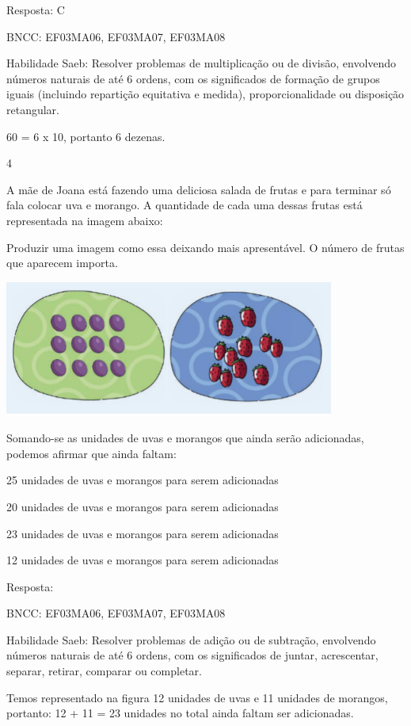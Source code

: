 \begin{escolha}
{\begin{escolha}
{Resposta: C

BNCC: EF03MA06, EF03MA07, EF03MA08

Habilidade Saeb: Resolver problemas de multiplicação ou de divisão,
envolvendo números naturais de até 6 ordens, com os significados de
formação de grupos iguais (incluindo repartição equitativa e medida),
proporcionalidade ou disposição retangular.

60 = 6 x 10, portanto 6 dezenas.

\num{4}

A mãe de Joana está fazendo uma deliciosa salada de frutas e para
terminar só fala colocar uva e morango. A quantidade de cada uma dessas
frutas está representada na imagem abaixo:

Produzir uma imagem como essa deixando mais apresentável. O número de
frutas que aparecem importa.

\includegraphics[width=4.26704in,height=1.75849in]{media/image132.png}

Somando-se as unidades de uvas e morangos que ainda serão adicionadas,
podemos afirmar que ainda faltam:

\begin{escolha}

\item
  25 unidades de uvas e morangos para serem adicionadas
\item
  20 unidades de uvas e morangos para serem adicionadas
\item
  23 unidades de uvas e morangos para serem adicionadas
\item
  12 unidades de uvas e morangos para serem adicionadas
\end{escolha}

Resposta:

BNCC: EF03MA06, EF03MA07, EF03MA08

Habilidade Saeb: Resolver problemas de adição ou de subtração,
envolvendo números naturais de até 6 ordens, com os significados de
juntar, acrescentar, separar, retirar, comparar ou completar.

Temos representado na figura 12 unidades de uvas e 11 unidades de
morangos, portanto: 12 + 11 = 23 unidades no total ainda faltam ser
adicionadas.

}
\end{escolha}}
\end{escolha}
